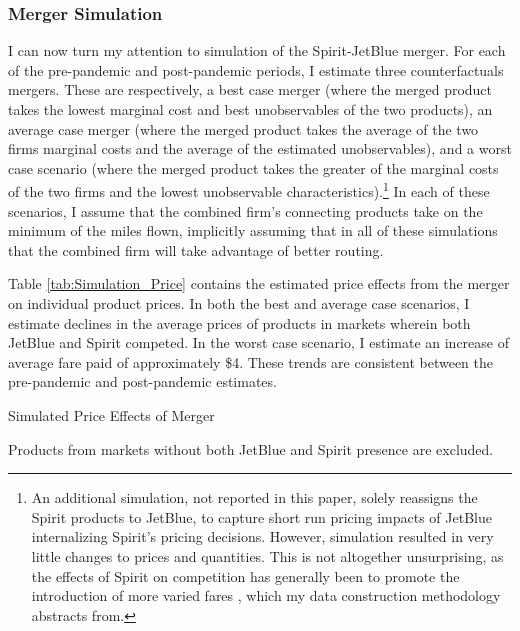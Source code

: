 \documentclass{article}
\begin{document}
	\subsubsection{Merger Simulation}
	\label{sec:Analysis_Merger}
	I can now turn my attention to simulation of the Spirit-JetBlue merger. For each of the pre-pandemic and post-pandemic periods, I estimate three counterfactuals mergers. These are respectively, a best case merger (where the merged product takes the lowest marginal cost and best unobservables of the two products), an average case merger (where the merged product takes the average of the two firms marginal costs and the average of the estimated unobservables), and a worst case scenario (where the merged product takes the greater of the marginal costs of the two firms and the lowest unobservable characteristics).\footnote{An additional simulation, not reported in this paper, solely reassigns the Spirit products to JetBlue, to capture short run pricing impacts of JetBlue internalizing Spirit's pricing decisions. However, simulation resulted in very little changes to prices and quantities. This is not altogether unsurprising, as the effects of Spirit on competition has generally been to promote the introduction of more varied fares \citep{shrago_spirit_2024}, which my data construction methodology abstracts from.} In each of these scenarios, I assume that the combined firm's connecting products take on the minimum of the miles flown, implicitly assuming that in all of these simulations that the combined firm will take advantage of better routing. %

     
	 Table \ref{tab:Simulation_Price} contains the estimated price effects from the merger on individual product prices. In both the best and average case scenarios, I estimate declines in the average prices of products in markets wherein both JetBlue and Spirit competed. In the worst case scenario, I estimate an increase of average fare paid of approximately \$4. These trends are consistent between the pre-pandemic and post-pandemic estimates.  
     
    \begin{table}
        \caption{Simulated Price Effects of Merger}
        \label{tab:Simulation_Price}
                \vspace{-15mm}
        \begin{center}
         
         \footnotesize{Products from markets without both JetBlue and Spirit presence are excluded.}
        \end{center}
     \end{table}
\end{document}
